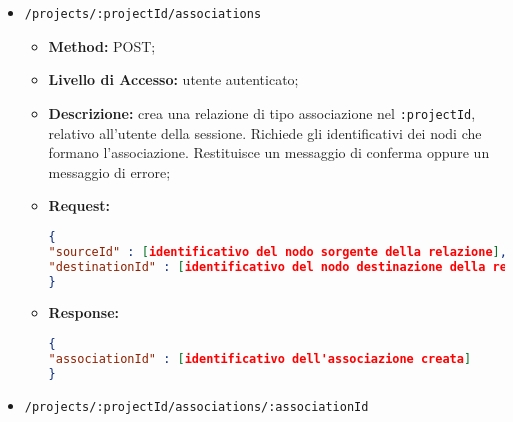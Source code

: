 \begin{itemize}
\begin{itemize}
\item \textbf{Method:} DELETE;
\item \textbf{Livello di Accesso:} utente autenticato;
\item \textbf{Descrizione:} elimina dal database il nodo \texttt{:nodeId}, nel  \texttt{:projectId}, relativo all'utente della sessione. Oltre ad esso viene eliminato l'eventuale sotto-albero di cui \texttt{:nodeId} è padre, le associazioni che coinvolgono i nodi del sotto-albero e vengono aggiornati i  in cui il nodo compariva. Restituisce la nuova mappa mentale, con nodi e relazioni aggiornati oppure un messaggio di errore;
\item \textbf{Response:}
\begin{lstlisting}[language=json,firstnumber=1]
{
"nodes" : [array JSON di nodi, con attributi specificati nei diagrammi delle classi],
"relations" : [array JSON di relazioni, con attributi specificati nei diagrammi delle classi]
}
\end{lstlisting}
\end{itemize}
\item \texttt{/projects/:projectId/associations}
\begin{itemize}
\item \textbf{Method:} POST;
\item \textbf{Livello di Accesso:} utente autenticato;
\item \textbf{Descrizione:} crea una relazione di tipo associazione nel  \texttt{:projectId}, relativo all'utente della sessione. Richiede gli identificativi dei nodi che formano l'associazione. Restituisce un messaggio di conferma oppure un messaggio di errore;
\item \textbf{Request:}
\begin{lstlisting}[language=json,firstnumber=1]
{
"sourceId" : [identificativo del nodo sorgente della relazione],
"destinationId" : [identificativo del nodo destinazione della relazione]
}
\end{lstlisting}
\item \textbf{Response:}
\begin{lstlisting}[language=json,firstnumber=1]
{
"associationId" : [identificativo dell'associazione creata]
}
\end{lstlisting}
\end{itemize}
\item \texttt{/projects/:projectId/associations/:associationId}

\end{itemize}
